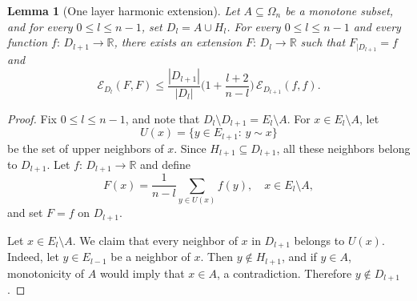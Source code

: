 \documentclass[12pt,final]{amsart}
\newcommand{\1}{\mathbf{1}}
\newtheorem{lemma}[theorem]{Lemma}
\newcommand{\Ecal}{\mathcal{E}}
\newcommand{\R}{\mathbb{R}}
\begin{document}
\begin{lemma}[One layer harmonic extension]\label{lem:one-step-extension}
    Let $A\subseteq \Omega_n$ be a monotone subset, and for every $0\leq l\leq n-1$, set $D_l=A\cup H_l$. For every $0\leq l\leq n-1$ and every function $f:\, D_{l+1}\to \R$, there exists an extension $F:\, D_{l}\to \R$ such that $F_{\mid D_{l+1}}=f$ and 
    $$
    \Ecal_{D_l}(F,F)\leq \frac{|D_{l+1}|}{|D_l|} \Big(1+\frac{l+2}{n-l}\Big)\, \Ecal_{D_{l+1}}(f,f). 
    $$
\end{lemma}
\begin{proof}
 Fix $0\leq l\leq n-1$, and note that $D_l\setminus D_{l+1}=E_l\setminus A$. For $x\in E_l\setminus A$, let 
 $$
 U(x)=\{y\in E_{l+1}:\, y\sim x\}
 $$
 be the set of upper neighbors of $x$. Since $H_{l+1}\subseteq D_{l+1}$, all these neighbors belong to $D_{l+1}$. 
 Let $f:\, D_{l+1}\to \R$ and define 
 $$
 F(x)=\frac{1}{n-l}\sum_{y\in U(x)} f(y),\quad x\in E_l\setminus A,
 $$
 and set $F=f$ on $D_{l+1}$. 

Let $x\in E_l\setminus A$. We claim that every neighbor of $x$ in $D_{l+1}$ belongs to $U(x)$. Indeed, let $y\in E_{l-1}$ be a neighbor of $x$. Then $y\not\in H_{l+1}$, and if $y\in A$, monotonicity of $A$ would imply that $x\in A$, a contradiction. Therefore $y\not\in D_{l+1}$. 


\end{proof}
\end{document}
